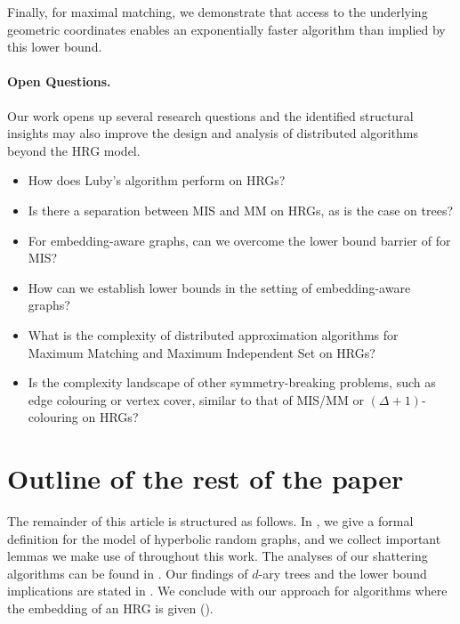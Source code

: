 \documentclass[letterpaper,11pt]{article}
\newcommand{\1}{\mathbb I}
\begin{document}
Finally, for maximal matching, we demonstrate that access to the underlying geometric coordinates enables an exponentially faster algorithm than implied by this lower bound.

\paragraph{Open Questions.} 
%
Our work opens up several research questions and  the identified structural insights may also improve the design and analysis of distributed algorithms beyond the HRG model.
\begin{itemize}
    \item How does Luby's algorithm perform on HRGs?
    \item Is there a separation between MIS and MM on HRGs, as is the case on trees?
    \item For embedding-aware graphs, can we overcome the lower bound barrier of  for MIS?
    \item How can we establish lower bounds in the setting of embedding-aware graphs?
    \item What is the complexity of distributed approximation algorithms for Maximum Matching and Maximum Independent Set on HRGs?
    \item Is the complexity landscape of other symmetry-breaking problems, such as edge colouring or vertex cover, similar to that of MIS/MM or $(\Delta+1)$-colouring on HRGs?
\end{itemize}
%
\section*{Outline of the rest of the paper} The remainder of this article is structured as follows. In , we give a formal definition for the model of hyperbolic random graphs, and we collect important lemmas we make use of throughout this work. The analyses of our shattering algorithms can be found in . Our findings of $d$-ary trees and the lower bound implications are stated in . We conclude with our approach for algorithms where the embedding of an HRG is given (). 
%
\end{document}
